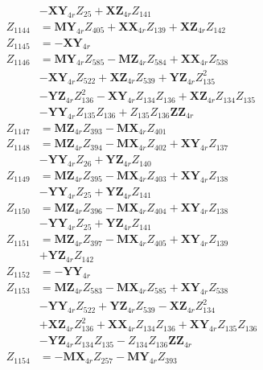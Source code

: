 \begin{multicols}{2}
\begin{align}
&- \mathbf{XY}_{4r}Z_{25} + \mathbf{XZ}_{4r}Z_{141} \nonumber \\
Z_{1144} &= \mathbf{MY}_{4r}Z_{405} + \mathbf{XX}_{4r}Z_{139} + \mathbf{XZ}_{4r}Z_{142} \nonumber \\
Z_{1145} &= -\mathbf{XY}_{4r} \nonumber \\
Z_{1146} &= \mathbf{MY}_{4r}Z_{585} - \mathbf{MZ}_{4r}Z_{584} + \mathbf{XX}_{4r}Z_{538}  \nonumber \\
&- \mathbf{XY}_{4r}Z_{522} + \mathbf{XZ}_{4r}Z_{539} + \mathbf{YZ}_{4r}Z_{135}^2  \nonumber \\
&- \mathbf{YZ}_{4r}Z_{136}^2 - \mathbf{XY}_{4r}Z_{134}Z_{136} + \mathbf{XZ}_{4r}Z_{134}Z_{135}  \nonumber \\
&- \mathbf{YY}_{4r}Z_{135}Z_{136} + Z_{135}Z_{136}\mathbf{ZZ}_{4r} \nonumber \\
Z_{1147} &= \mathbf{MZ}_{4r}Z_{393} - \mathbf{MX}_{4r}Z_{401} \nonumber \\
Z_{1148} &= \mathbf{MZ}_{4r}Z_{394} - \mathbf{MX}_{4r}Z_{402} + \mathbf{XY}_{4r}Z_{137}  \nonumber \\
&- \mathbf{YY}_{4r}Z_{26} + \mathbf{YZ}_{4r}Z_{140} \nonumber \\
Z_{1149} &= \mathbf{MZ}_{4r}Z_{395} - \mathbf{MX}_{4r}Z_{403} + \mathbf{XY}_{4r}Z_{138}  \nonumber \\
&- \mathbf{YY}_{4r}Z_{25} + \mathbf{YZ}_{4r}Z_{141} \nonumber \\
Z_{1150} &= \mathbf{MZ}_{4r}Z_{396} - \mathbf{MX}_{4r}Z_{404} + \mathbf{XY}_{4r}Z_{138}  \nonumber \\
&- \mathbf{YY}_{4r}Z_{25} + \mathbf{YZ}_{4r}Z_{141} \nonumber \\
Z_{1151} &= \mathbf{MZ}_{4r}Z_{397} - \mathbf{MX}_{4r}Z_{405} + \mathbf{XY}_{4r}Z_{139}  \nonumber \\
&+ \mathbf{YZ}_{4r}Z_{142} \nonumber \\
Z_{1152} &= -\mathbf{YY}_{4r} \nonumber \\
Z_{1153} &= \mathbf{MZ}_{4r}Z_{583} - \mathbf{MX}_{4r}Z_{585} + \mathbf{XY}_{4r}Z_{538}  \nonumber \\
&- \mathbf{YY}_{4r}Z_{522} + \mathbf{YZ}_{4r}Z_{539} - \mathbf{XZ}_{4r}Z_{134}^2  \nonumber \\
&+ \mathbf{XZ}_{4r}Z_{136}^2 + \mathbf{XX}_{4r}Z_{134}Z_{136} + \mathbf{XY}_{4r}Z_{135}Z_{136}  \nonumber \\
&- \mathbf{YZ}_{4r}Z_{134}Z_{135} - Z_{134}Z_{136}\mathbf{ZZ}_{4r} \nonumber \\
Z_{1154} &= - \mathbf{MX}_{4r}Z_{257} - \mathbf{MY}_{4r}Z_{393} \nonumber \\

\end{align}
\end{multicols}

